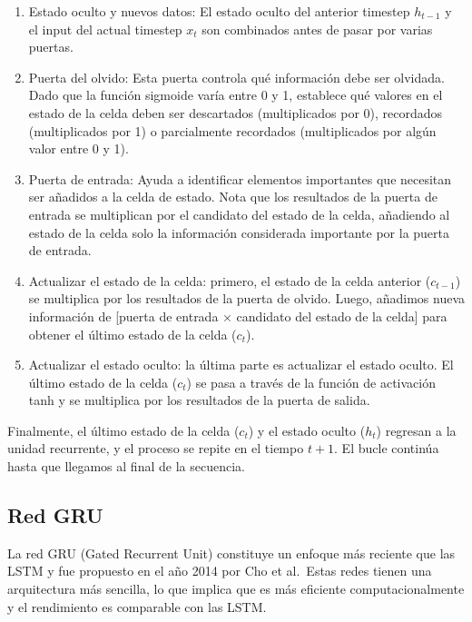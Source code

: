 \documentclass[
  a4paper,
  DIV=11,
  numbers=noendperiod]{scrreprt}
\begin{document}
\begin{enumerate}
\def\labelenumi{\arabic{enumi}.}
\item
  Estado oculto y nuevos datos: El estado oculto del anterior timestep
  \(h_{t-1}\) y el input del actual timestep \(x_t\) son combinados
  antes de pasar por varias puertas.
\item
  Puerta del olvido: Esta puerta controla qué información debe ser
  olvidada. Dado que la función sigmoide varía entre 0 y 1, establece
  qué valores en el estado de la celda deben ser descartados
  (multiplicados por 0), recordados (multiplicados por 1) o parcialmente
  recordados (multiplicados por algún valor entre 0 y 1).
\item
  Puerta de entrada: Ayuda a identificar elementos importantes que
  necesitan ser añadidos a la celda de estado. Nota que los resultados
  de la puerta de entrada se multiplican por el candidato del estado de
  la celda, añadiendo al estado de la celda solo la información
  considerada importante por la puerta de entrada.
\item
  Actualizar el estado de la celda: primero, el estado de la celda
  anterior (\(c_{t-1}\)) se multiplica por los resultados de la puerta
  de olvido. Luego, añadimos nueva información de {[}puerta de entrada ×
  candidato del estado de la celda{]} para obtener el último estado de
  la celda (\(c_t\)).
\item
  Actualizar el estado oculto: la última parte es actualizar el estado
  oculto. El último estado de la celda (\(c_t\)) se pasa a través de la
  función de activación tanh y se multiplica por los resultados de la
  puerta de salida.
\end{enumerate}

Finalmente, el último estado de la celda (\(c_t\)) y el estado oculto
(\(h_t\)) regresan a la unidad recurrente, y el proceso se repite en el
tiempo \(t+1\). El bucle continúa hasta que llegamos al final de la
secuencia.

\subsection{Red GRU}\label{red-gru}

La red GRU (Gated Recurrent Unit) constituye un enfoque más reciente que
las LSTM y fue propuesto en el año 2014 por Cho et al.~Estas redes
tienen una arquitectura más sencilla, lo que implica que es más
eficiente computacionalmente y el rendimiento es comparable con las
LSTM.
\end{document}
